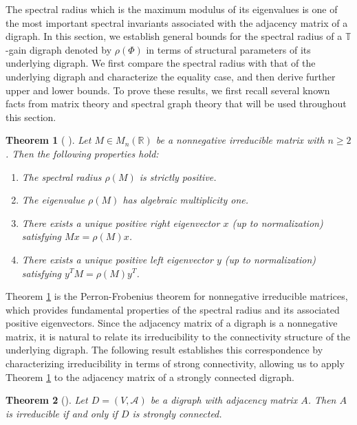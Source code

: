 \documentclass[12pt]{article}
\newtheorem{theorem}{Theorem}[section]
\theoremstyle{definition}
\newcommand{\TT}{\mathbb{T}}
\begin{document}
The spectral radius which is the maximum modulus of its eigenvalues is one of the most important spectral invariants associated with the adjacency matrix of a digraph. In this section, we establish general bounds for the spectral radius of a $\TT$-gain digraph denoted by $\rho(\Phi)$ in terms of structural parameters of its underlying digraph. We first compare the spectral radius with that of the underlying digraph and characterize the equality case, and then derive further upper and lower bounds. To prove these results, we first recall several known facts from matrix theory and spectral graph theory that will be used throughout this section.

\begin{theorem}[ {\cite[p.~534]{HornJohnson}}] \label{a}
Let $M \in M_n(\mathbb{R})$ be a nonnegative irreducible matrix with $n\ge2$. Then the following properties hold:

\begin{enumerate}
    \item The spectral radius $\rho(M)$ is strictly positive.
    \item The eigenvalue $\rho(M)$ has algebraic multiplicity one.
    \item There exists a unique positive right eigenvector $x$ (up to normalization) satisfying $Mx=\rho(M)x$.
    \item There exists a unique positive left eigenvector $y$ (up to normalization) satisfying $y^{T}M=\rho(M)y^{T}$.
\end{enumerate}
\end{theorem}

Theorem \ref{a} is the Perron-Frobenius theorem for nonnegative irreducible matrices, which provides fundamental properties of the spectral radius and its associated positive eigenvectors. Since the adjacency matrix of a digraph is a nonnegative matrix, it is natural to relate its irreducibility to the connectivity structure of the underlying digraph. The following result establishes this correspondence by characterizing irreducibility in terms of strong connectivity, allowing us to apply Theorem \ref{a} to the adjacency matrix of a strongly connected digraph.

\begin{theorem}[{\cite[p.~55]{BrualdiRyser1991}}] \label{b}
Let $D=(V,\mathcal{A})$ be a digraph with adjacency matrix $A$. Then $A$ is irreducible if and only if $D$ is strongly connected.
\end{theorem}
\end{document}
